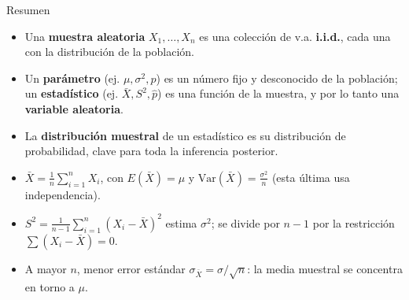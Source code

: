 \documentclass[aspectratio=169,11pt]{beamer}
\begin{document}
\begin{frame}{Resumen}
\begin{itemize}
\item Una \textbf{muestra aleatoria} $X_1,\dots,X_n$ es una colección de v.a. \textbf{i.i.d.}, cada una con la distribución de la población.
\item Un \textbf{parámetro} (ej. $\mu,\sigma^2,p$) es un número fijo y desconocido de la población; un \textbf{estadístico} (ej. $\bar X, S^2,\hat p$) es una función de la muestra, y por lo tanto una \textbf{variable aleatoria}.
\item La \textbf{distribución muestral} de un estadístico es su distribución de probabilidad, clave para toda la inferencia posterior.
\item $\displaystyle \bar X = \frac{1}{n}\sum_{i=1}^n X_i$, con $\displaystyle E(\bar X)=\mu$ y $\displaystyle \text{Var}(\bar X)=\frac{\sigma^2}{n}$ (esta última usa independencia).
\item $\displaystyle S^2 = \frac{1}{n-1}\sum_{i=1}^n (X_i-\bar X)^2$ estima $\sigma^2$; se divide por $n-1$ por la restricción $\sum (X_i-\bar X)=0$.
\item A mayor $n$, menor error estándar $\sigma_{\bar X}=\sigma/\sqrt n$: la media muestral se concentra en torno a $\mu$.
\end{itemize}
\end{frame}
\end{document}

